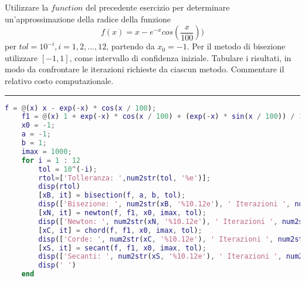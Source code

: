 Utilizzare la $function$ del precedente esercizio per determinare un'approssimazione della
radice della funzione
$$f(x)=x-e^{-x}cos(\frac{x}{100}))$$
per $tol=10^{-i}, i=1,2,...,12$, partendo da $x_\mathrm{0}=-1$. Per il metodo di bisezione utilizzare 
$[-1,1]$, come intervallo di confidenza iniziale. Tabulare i risultati, in modo da confrontare le iterazioni
richieste da ciascun metodo. Commentare il relativo costo computazionale.

\hspace{1cm}
\par\noindent\rule{\textwidth}{0.4pt}
\hspace{1cm}

\begin{lstlisting}[language=Matlab, caption=Codice Matlab]
	f = @(x) x - exp(-x) * cos(x / 100);
	f1 = @(x) 1 + exp(-x) * cos(x / 100) + (exp(-x) * sin(x / 100)) / 100;
	x0 = -1;
	a = -1;
	b = 1;
	imax = 1000;
	for i = 1 : 12
		tol = 10^(-i);
		rtol=['Tolleranza: ',num2str(tol, '%e')];
		disp(rtol)
		[xB, it] = bisection(f, a, b, tol);
		disp(['Bisezione: ', num2str(xB, '%10.12e'), ' Iterazioni ', num2str(it)])
		[xN, it] = newton(f, f1, x0, imax, tol);
		disp(['Newton: ', num2str(xN, '%10.12e'), ' Iterazioni ', num2str(it)])
		[xC, it] = chord(f, f1, x0, imax, tol);
		disp(['Corde: ', num2str(xC, '%10.12e'), ' Iterazioni ', num2str(it)])
		[xS, it] = secant(f, f1, x0, imax, tol);
		disp(['Secanti: ', num2str(xS, '%10.12e'), ' Iterazioni ', num2str(it)])
		disp(' ')
	end
\end{lstlisting}

